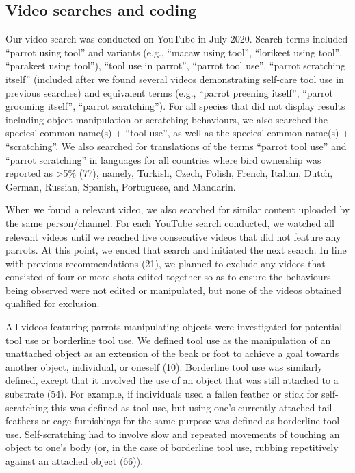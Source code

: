 \documentclass[
  man, donotrepeattitle,floatsintext]{apa6}
\begin{document}
\hypertarget{video-searches-and-coding}{%
\subsection{Video searches and coding}\label{video-searches-and-coding}}

Our video search was conducted on YouTube in July 2020. Search terms included
``parrot using tool'' and variants (e.g., ``macaw using tool'', ``lorikeet using
tool'', ``parakeet using tool''), ``tool use in parrot'', ``parrot tool use'', ``parrot
scratching itself'' (included after we found several videos demonstrating
self-care tool use in previous searches) and equivalent terms (e.g., ``parrot
preening itself'', ``parrot grooming itself'', ``parrot scratching''). For all
species that did not display results including object manipulation or scratching
behaviours, we also searched the species' common name(s) + ``tool use'', as well
as the species' common name(s) + ``scratching''. We also searched for translations
of the terms ``parrot tool use'' and ``parrot scratching'' in languages for all
countries where bird ownership was reported as \textgreater5\% (77), namely,
Turkish, Czech, Polish, French, Italian, Dutch, German, Russian, Spanish,
Portuguese, and Mandarin.

When we found a relevant video, we also searched for similar content uploaded by
the same person/channel. For each YouTube search conducted, we watched all
relevant videos until we reached five consecutive videos that did not feature
any parrots. At this point, we ended that search and initiated the next search.
In line with previous recommendations (21), we planned to exclude any
videos that consisted of four or more shots edited together so as to ensure the
behaviours being observed were not edited or manipulated, but none of the videos
obtained qualified for exclusion.

All videos featuring parrots manipulating objects were investigated for
potential tool use or borderline tool use. We defined tool use as the
manipulation of an unattached object as an extension of the beak or foot to
achieve a goal towards another object, individual, or oneself (10).
Borderline tool use was similarly defined, except that it involved the use of an
object that was still attached to a substrate (54). For example, if
individuals used a fallen feather or stick for self-scratching this was defined
as tool use, but using one's currently attached tail feathers or cage
furnishings for the same purpose was defined as borderline tool use.
Self-scratching had to involve slow and repeated movements of touching an object
to one's body (or, in the case of borderline tool use, rubbing repetitively
against an attached object (66)).
\end{document}
